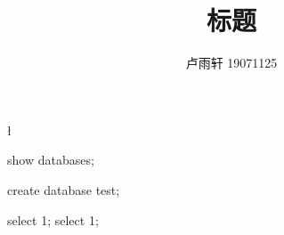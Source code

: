 \documentclass{ctexart}
\title{标题}
\author{卢雨轩 19071125}
\begin{document}
\maketitle

\begin{run}
    \l
\end{run}
\begin{run}
show databases;
\end{run}

\begin{run}
create database test;
\end{run}

\begin{run}
select 1;
select 1;
\end{run}
\end{document}
